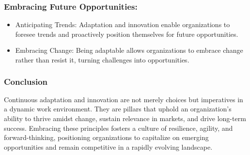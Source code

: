 \documentclass[a4paper, twoside]{article}
\begin{document}
\subsubsection{Embracing Future Opportunities:}
\begin{itemize}
    \item Anticipating Trends: Adaptation and innovation enable organizations to foresee trends and proactively position themselves for future opportunities.
    \item Embracing Change: Being adaptable allows organizations to embrace change rather than resist it, turning challenges into opportunities.
\end{itemize}

\subsubsection{Conclusion}
Continuous adaptation and innovation are not merely choices but imperatives in a dynamic work environment. They are pillars that uphold an organization's ability to thrive amidst change, sustain relevance in markets, and drive long-term success. Embracing these principles fosters a culture of resilience, agility, and forward-thinking, positioning organizations to capitalize on emerging opportunities and remain competitive in a rapidly evolving landscape.



\newpage
\printbibliography[
heading=bibintoc,
title={References}
]
\end{document}
